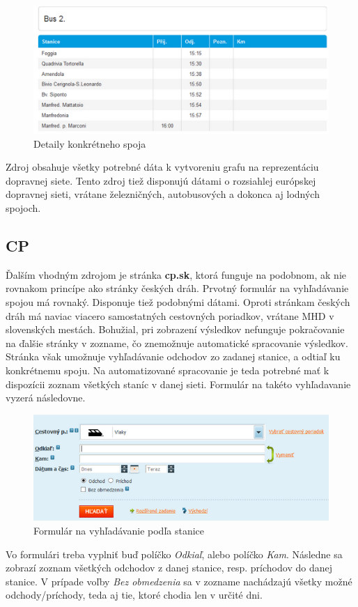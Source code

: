\documentclass[12pt,twoside,slovak,a4paper]{article}
\begin{document}
	 \begin{figure}[H]
	 \caption{Detaily konkrétneho spoja}
	 \includegraphics{cd_spoj}
	 \end{figure}
	 
	 Zdroj obsahuje všetky potrebné dáta k vytvoreniu grafu na reprezentáciu dopravnej siete.  Tento zdroj tiež disponujú dátami o rozsiahlej európskej dopravnej sieti, vrátane železničných, autobusových a dokonca aj lodných spojoch.
		 
	 \subsection{CP}
	 Ďalším vhodným zdrojom je stránka \textbf{cp.sk}, ktorá funguje na podobnom, ak nie rovnakom princípe ako stránky českých dráh. Prvotný formulár na vyhľadávanie spojou má rovnaký. Disponuje tiež podobnými dátami. Oproti stránkam českých dráh má naviac viacero samostatných cestovných poriadkov, vrátane MHD v slovenských mestách. Bohužial, pri zobrazení výsledkov nefunguje pokračovanie na ďalšie stránky v zozname, čo znemožnuje automatické spracovanie výsledkov.
	Stránka však umožnuje vyhľadávanie odchodov zo zadanej stanice, a odtiaľ ku konkrétnemu spoju. Na automatizované spracovanie je teda potrebné mať k dispozícii zoznam všetkých staníc v danej sieti. Formulár na takéto vyhľadavanie vyzerá následovne.
	\begin{figure}[H]
	 \caption{Formulár na vyhľadávanie podľa stanice}
	 \includegraphics{cp_odchod_form}
	 \end{figure}
	 Vo formulári treba vyplniť buď políčko \emph{Odkiaľ}, alebo políčko \emph{Kam}. Následne sa zobrazí zoznam všetkých odchodov z danej stanice, resp. príchodov do danej stanice. V prípade voľby \emph{Bez obmedzenia} sa v zozname nachádzajú všetky možné odchody/príchody, teda aj tie, ktoré chodia len v určité dni.
	 	
\end{document}
